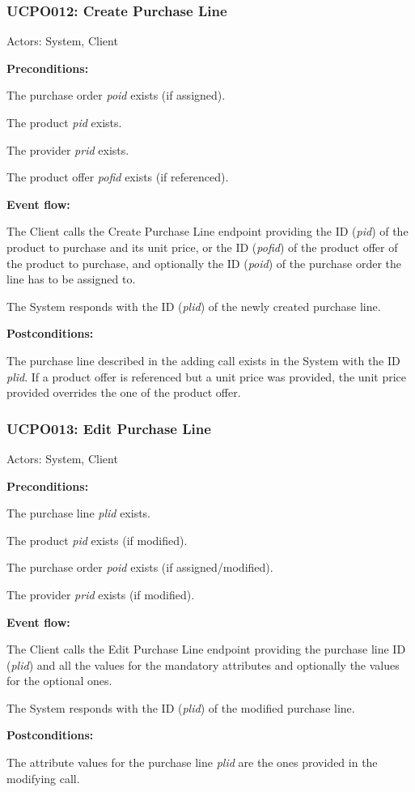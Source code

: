 \begin{ucbox}{\subsubsection{UCPO012: Create Purchase Line}}
\label{UCPO012}

Actors: System, Client

\textbf{Preconditions:}

\ucitem The purchase order \textit{poid} exists (if assigned).

\ucitem The product \textit{pid} exists.

\ucitem The provider \textit{prid} exists.

\ucitem The product offer \textit{pofid} exists (if referenced).

\textbf{Event flow:}

\ucitem The Client calls the Create Purchase Line endpoint providing the ID (\textit{pid}) of the product to purchase and its unit price, or the ID (\textit{pofid}) of the product offer of the product to purchase, and optionally the ID (\textit{poid}) of the purchase order the line has to be assigned to.

\ucitem The System responds with the ID (\textit{plid}) of the newly created purchase line.

\textbf{Postconditions:}

\ucitem The purchase line described in the adding call exists in the System with the ID \textit{plid}. If a product offer is referenced but a unit price was provided, the unit price provided overrides the one of the product offer.

\end{ucbox}

\begin{ucbox}{\subsubsection{UCPO013: Edit Purchase Line}}
\label{UCPO013}

Actors: System, Client

\textbf{Preconditions:}

\ucitem The purchase line \textit{plid} exists.

\ucitem The product \textit{pid} exists (if modified).

\ucitem The purchase order \textit{poid} exists (if assigned/modified).

\ucitem The provider \textit{prid} exists (if modified).

\textbf{Event flow:}

\ucitem The Client calls the Edit Purchase Line endpoint providing the purchase line ID (\textit{plid}) and all the values for the mandatory attributes and optionally the values for the 
optional ones.

\ucitem The System responds with the ID (\textit{plid}) of the modified purchase line.

\textbf{Postconditions:}

\ucitem The attribute values for the purchase line \textit{plid} are the ones provided in the modifying call.

\end{ucbox}

